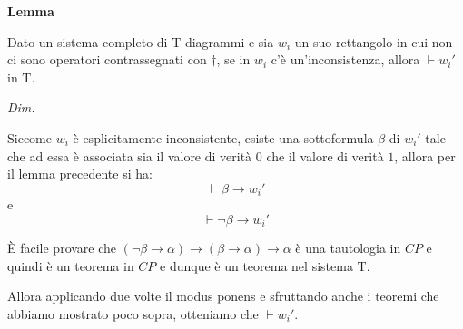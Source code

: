 \documentclass[a4paper, titlepage, 12pt]{report}
\begin{document}
\begin{flushleft}
\textbf{Lemma}

Dato un sistema completo di T-diagrammi e sia $w_i$ un suo rettangolo in cui
non ci sono operatori contrassegnati con $\dagger$,
se in $w_i$ c'è un'inconsistenza, allora $\vdash w_i'$ in T.

\textit{Dim.}

Siccome $w_i$ è esplicitamente inconsistente, esiste una sottoformula $\beta$ di $w_i'$
tale che ad essa è associata sia il valore di verità $0$ che il valore di verità $1$,
allora per il lemma precedente si ha:
$$\vdash \beta \rightarrow w_i'$$
e
$$\vdash \neg \beta \rightarrow w_i'$$

È facile provare che
$(\neg \beta \rightarrow \alpha) \rightarrow (\beta \rightarrow \alpha) \rightarrow \alpha$
è una tautologia in $CP$ e quindi è un teorema in $CP$ e dunque è un teorema nel sistema T.

Allora applicando due volte il modus ponens e sfruttando anche i teoremi che abbiamo mostrato poco sopra,
otteniamo che $\vdash w_i'$.

\end{flushleft}
\end{document}
